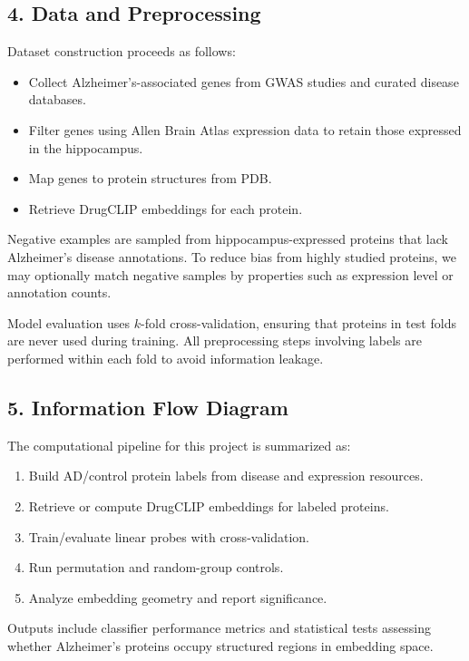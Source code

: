 \documentclass{article}
\begin{document}
\subsection*{4. Data and Preprocessing}
Dataset construction proceeds as follows:
\begin{itemize}
    \item Collect Alzheimer's-associated genes from GWAS studies \cite{disgenet2023,lambert2013} and curated disease databases.
    \item Filter genes using Allen Brain Atlas expression data to retain those expressed in the hippocampus.
    \item Map genes to protein structures from PDB.
    \item Retrieve DrugCLIP embeddings for each protein.
\end{itemize}

Negative examples are sampled from hippocampus-expressed proteins that lack Alzheimer's disease annotations. To reduce bias from highly studied proteins, we may optionally match negative samples by properties such as expression level or annotation counts.

Model evaluation uses $k$-fold cross-validation, ensuring that proteins in test folds are never used during training. All preprocessing steps involving labels are performed within each fold to avoid information leakage.

\subsection*{5. Information Flow Diagram}
The computational pipeline for this project is summarized as:
\begin{enumerate}
    \item Build AD/control protein labels from disease and expression resources.
    \item Retrieve or compute DrugCLIP embeddings for labeled proteins.
    \item Train/evaluate linear probes with cross-validation.
    \item Run permutation and random-group controls.
    \item Analyze embedding geometry and report significance.
\end{enumerate}

Outputs include classifier performance metrics and statistical tests assessing whether Alzheimer's proteins occupy structured regions in embedding space.
\end{document}

